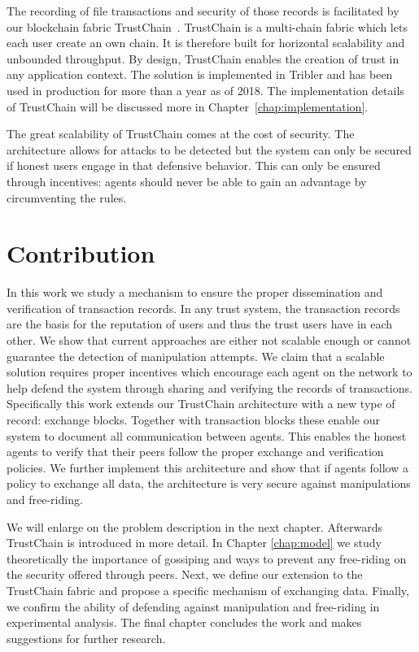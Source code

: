 The recording of file transactions and security of those records is facilitated by our blockchain
fabric TrustChain~\cite{OTTE2017}. TrustChain is a multi-chain fabric which lets each user create
an own chain. It is therefore built for horizontal scalability and unbounded throughput. By design,
TrustChain enables the creation of trust in any application context. The solution is implemented
in Tribler and has been used in production for more than a year as of 2018. The implementation 
details of TrustChain will be discussed more in Chapter~\ref{chap:implementation}. 

The great scalability of TrustChain comes at the cost of security. The architecture allows for 
attacks to be detected but the system can only be secured if honest users engage in that defensive 
behavior. This can only be ensured through incentives: agents should never be able to gain an 
advantage by circumventing the rules. 

\section{Contribution}
In this work we study a mechanism to ensure the proper dissemination and verification of transaction
records. In any trust system, the transaction records are the basis for the reputation of users and 
thus the trust users have in each other. We show that current approaches are either not scalable 
enough or cannot guarantee the detection of manipulation attempts. We claim that a scalable solution
requires proper incentives which encourage each agent on the network to help defend the system through
sharing and verifying the records of transactions. Specifically this work extends our TrustChain 
architecture with a new type of record: exchange blocks. Together with transaction blocks these 
enable our system to document all communication between agents. This enables the honest agents to 
verify that their peers follow the proper exchange and verification policies. We further implement
this architecture and show that if agents follow a policy to exchange all data, the architecture is
very secure against manipulations and free-riding.

We will enlarge on the problem description in the next chapter. Afterwards TrustChain is introduced
in more detail. In Chapter \ref{chap:model} we study theoretically the importance of gossiping and 
ways to prevent any free-riding on the security offered through peers. Next, we define our extension
to the TrustChain fabric and propose a specific mechanism of exchanging data. Finally, we confirm the 
ability of defending against manipulation and free-riding in experimental analysis. 
The final chapter concludes the work and makes suggestions for further research.